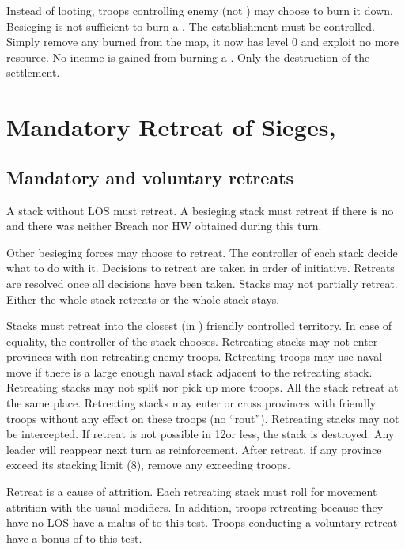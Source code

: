\aparag[Burning \TP]
\bparag Instead of looting, troops controlling enemy \TP (not \COL) may choose
to burn it down.
\bparag Besieging is not sufficient to burn a \TP. The establishment must be
controlled.
\bparag Simply remove any burned \TP from the map, it now has level 0 and
exploit no more resource.
\bparag No income is gained from burning a \TP. Only the destruction of the
settlement.
\section{Mandatory Retreat of Sieges, \Presidios}\label{chRedep:Retreat, presidios}

\subsection{Mandatory and voluntary retreats}
\bparag A stack without LOS must retreat.
\bparag A besieging stack must retreat if there is no \USURE\Faceplus and
there was neither Breach nor HW obtained during this turn.

\bparag Other besieging forces may choose to retreat. The controller of each
stack decide what to do with it.
\bparag Decisions to retreat are taken in order of initiative. Retreats are
resolved once all decisions have been taken.
\bparag Stacks may not partially retreat. Either the whole stack retreats or
the whole stack stays.

\bparag Stacks must retreat into the closest (in \MP) friendly controlled
territory. In case of equality, the controller of the stack chooses.
\bparag Retreating stacks may not enter provinces with non-retreating enemy
troops.
\bparag Retreating troops may use naval move if there is a large enough naval
stack adjacent to the retreating stack.
\bparag Retreating stacks may not split nor pick up more troops. All the stack
retreat at the same place.
\bparag Retreating stacks may enter or cross provinces with friendly troops
without any effect on these troops (no ``rout'').
\bparag Retreating stacks may not be intercepted.
\bparag If retreat is not possible in 12\MP or less, the stack is
destroyed. Any leader will reappear next turn as reinforcement.
\bparag After retreat, if any province exceed its stacking limit (8\LD),
remove any exceeding troops.

\bparag Retreat is a cause of attrition. Each retreating stack must roll for
movement attrition with the usual modifiers.
\bparag In addition, troops retreating because they have no LOS have a malus
of  to this test.
\bparag Troops conducting a voluntary retreat have a bonus of  to
this test.

